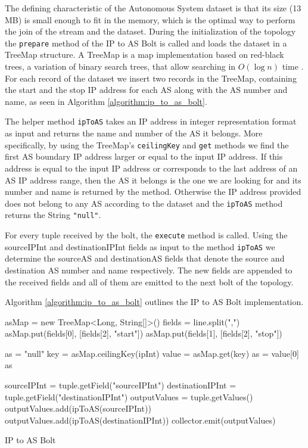 The defining characteristic of the Autonomous System dataset is that its size (13 MB) is small enough to fit in the memory, which is the optimal way to perform the join of the stream and the dataset. During the initialization of the topology the \texttt{prepare} method of the IP to AS Bolt is called and loads the dataset in a TreeMap structure. A TreeMap is a map implementation based on red-black trees, a variation of binary search trees, that allow searching in $O(\log{n})$ time \cite{treemap}. For each record of the dataset we insert two records in the TreeMap, containing the start and the stop IP address for each AS along with the AS number and name, as seen in Algorithm \ref{algorithm:ip_to_as_bolt}.

The helper method \texttt{ipToAS} takes an IP address in integer representation format as input and returns the name and number of the AS it belongs. More specifically, by using the TreeMap's \texttt{ceilingKey} and \texttt{get} methods we find the first AS boundary IP address larger or equal to the input IP address. If this address is equal to the input IP address or corresponds to the last address of an AS IP address range, then the AS it belongs is the one we are looking for and its number and name is returned by the method. Otherwise the IP address provided does not belong to any AS according to the dataset and the \texttt{ipToAS} method returns the String \texttt{"null"}.

For every tuple received by the bolt, the \texttt{execute} method is called. Using the sourceIPInt and destinationIPInt fields as input to the method \texttt{ipToAS} we determine the sourceAS and destinationAS fields that denote the source and destination AS number and name respectively. The new fields are appended to the received fields and all of them are emitted to the next bolt of the topology.

Algorithm \ref{algorithm:ip_to_as_bolt} outlines the IP to AS Bolt implementation. 

\begin{algorithm}[H]
\begin{algorithmic}[1]
\State asMap = new TreeMap<Long, String[]>()
\State fields = line.split(",")
\State asMap.put(fields[0], [fields[2], "start"])
\State asMap.put(fields[1], [fields[2], "stop"])
\EndFor
\EndFunction

\State as = "null"
\State key = asMap.ceilingKey(ipInt)
\State value = asMap.get(key)
\State as = value[0]
\EndIf
\EndIf
\Return as
\EndFunction

\State sourceIPInt = tuple.getField("sourceIPInt")
\State destinationIPInt = tuple.getField("destinationIPInt")
\State outputValues = tuple.getValues()
\State outputValues.add(ipToAS(sourceIPInt))
\State outputValues.add(ipToAS(destinationIPInt))
\State collector.emit(outputValues)
\EndFunction
\end{algorithmic}
\caption{IP to AS Bolt}
\label{algorithm:ip_to_as_bolt}
\end{algorithm}

